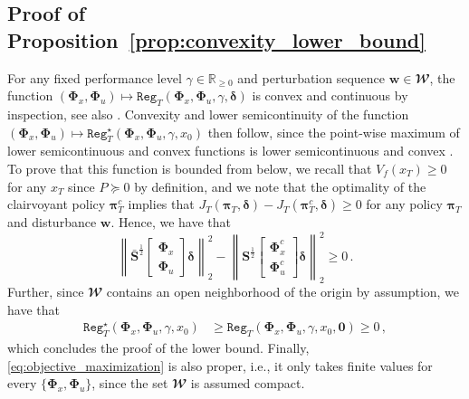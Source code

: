 \documentclass[conference]{IEEEtran}
\newcommand{\norm}[1]{\left\lVert#1\right\rVert}
\begin{document}
\subsection{Proof of Proposition~\ref{prop:convexity_lower_bound}}
\label{app:proof_convexity_lower_bound}
    For any fixed performance level $\gamma \in \mathbb{R}_{\geq 0}$ and perturbation sequence $\mathbf{w} \in \mathbfcal{W}$, the function $(\bm{\Phi}_x, \bm{\Phi}_u) \mapsto \mathtt{Reg}_T(\bm{\Phi}_x, \bm{\Phi}_u, \gamma, \bm{\delta})$ is convex and continuous by inspection, see also \cite{martin2022safe}. Convexity and lower semicontinuity of the function $(\bm{\Phi}_x, \bm{\Phi}_u) \mapsto \mathtt{Reg}_T^\star(\bm{\Phi}_x, \bm{\Phi}_u, \gamma, x_0)$ then follow, since the point-wise maximum of lower semicontinuous and convex functions is lower semicontinuous and convex \cite[Prop. 2.9]{rockafellar2009variational}.
    To prove that this function is bounded from below, we recall that $V_f(x_T) \geq 0$ for any $x_T$ since $P \succeq 0$ by definition, and we note that the optimality of the clairvoyant policy $\bm{\pi}^c_T$ implies that $J_T(\bm{\pi}_T, \bm{\delta}) - J_T(\bm{\pi}^c_T, \bm{\delta}) \geq 0$ for any policy $\bm{\pi}_T$ and disturbance $\mathbf{w}$. Hence, we have that
    \begin{equation*}
         \norm{\bar{\mathbf{S}}^{\frac{1}{2}} \begin{bmatrix}
            \bm{\Phi}_x \\ \bm{\Phi}_u
        \end{bmatrix} \bm{\delta}}_2^2
        -
        \norm{\mathbf{S}^{\frac{1}{2}} \begin{bmatrix}
            \bm{\Phi}_x^c \\ \bm{\Phi}_u^c
        \end{bmatrix} \bm{\delta}}_2^2 \geq 0\,.
    \end{equation*}
    Further, since $\mathbfcal{W}$ contains an open neighborhood of the origin by assumption, we have that
    \begin{align*}
        \mathtt{Reg}_T^\star(\bm{\Phi}_x, \bm{\Phi}_u, \gamma, x_0) &\geq \mathtt{Reg}_T(\bm{\Phi}_x, \bm{\Phi}_u, \gamma, x_0, \mathbf{0}) \geq 0\,,
    \end{align*}
    which concludes the proof of the lower bound. Finally, \eqref{eq:objective_maximization} is also proper, i.e., it only takes finite values for every $\{\bm{\Phi}_x, \bm{\Phi}_u\}$, since the set $\mathbfcal{W}$ is assumed compact.
\end{document}
